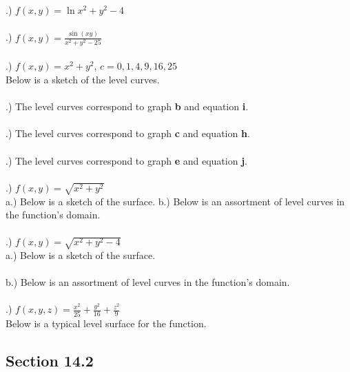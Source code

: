 \documentclass[12pt]{article}
\begin{document}
.) $f(x, y) = \ln{x^{2} + y^{2} - 4}$\\\\
.) $f(x, y) = \frac{\sin(xy)}{x^{2} + y^{2} - 25}$\\\\
.) $f(x,y) = x^{2} + y^{2}$, \hspace{10pt} $c = 0, 1, 4, 9, 16, 25$\\
\noindent Below is a sketch of the level curves.\vspace{4cm}\\\\
.) The level curves correspond to graph \textbf{b} and equation \textbf{i}.\\\\
.) The level curves correspond to graph \textbf{c} and equation \textbf{h}.\\\\
.) The level curves correspond to graph \textbf{e} and equation \textbf{j}.\\\\
.) $f(x, y) = \sqrt{x^{2} + y^{2}}$\\
\noindent a.) Below is a sketch of the surface.\vspace{4cm}
\noindent b.) Below is an assortment of level curves in the function's domain.\vspace{4cm}\\\\
.) $f(x, y) = \sqrt{x^{2} +y^{2} -4}$\\
\noindent a.) Below is a sketch of the surface.\vspace{4cm}\\\\
\noindent b.) Below is an assortment of level curves in the function's domain.\vspace{4cm}\\\\
.) $f(x, y, z) = \frac{x^{2}}{25} + \frac{y^{2}}{16} + \frac{z^{2}}{9}$\\
\noindent Below is a typical level surface for the function.\vspace{4cm}




\subsection*{Section 14.2}
\end{document}
